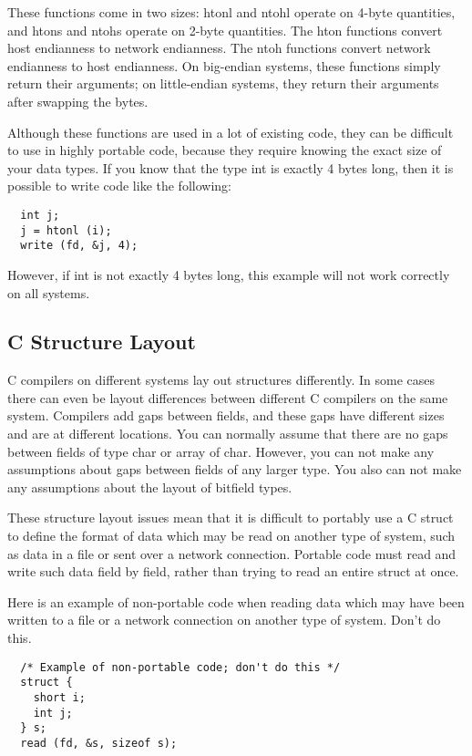 These functions come in two sizes: htonl and ntohl operate on 4-byte quantities, and htons and ntohs operate on 2-byte quantities. The hton functions convert host endianness to network endianness. The ntoh functions convert network endianness to host endianness. On big-endian systems, these functions simply return their arguments; on little-endian systems, they return their arguments after swapping the bytes.

Although these functions are used in a lot of existing code, they can be difficult to use in highly portable code, because they require knowing the exact size of your data types. If you know that the type int is exactly 4 bytes long, then it is possible to write code like the following:

\begin{verbatim}
  int j;
  j = htonl (i);
  write (fd, &j, 4);
\end{verbatim}

However, if int is not exactly 4 bytes long, this example will not work correctly on all systems.

\subsection{C Structure Layout}

C compilers on different systems lay out structures differently. In some cases there can even be layout differences between different C compilers on the same system. Compilers add gaps between fields, and these gaps have different sizes and are at different locations. You can normally assume that there are no gaps between fields of type char or array of char. However, you can not make any assumptions about gaps between fields of any larger type. You also can not make any assumptions about the layout of bitfield types.

These structure layout issues mean that it is difficult to portably use a C struct to define the format of data which may be read on another type of system, such as data in a file or sent over a network connection. Portable code must read and write such data field by field, rather than trying to read an entire struct at once.

Here is an example of non-portable code when reading data which may have been written to a file or a network connection on another type of system. Don't do this.

\begin{verbatim}
  /* Example of non-portable code; don't do this */
  struct {
    short i;
    int j;
  } s;
  read (fd, &s, sizeof s);
\end{verbatim}


